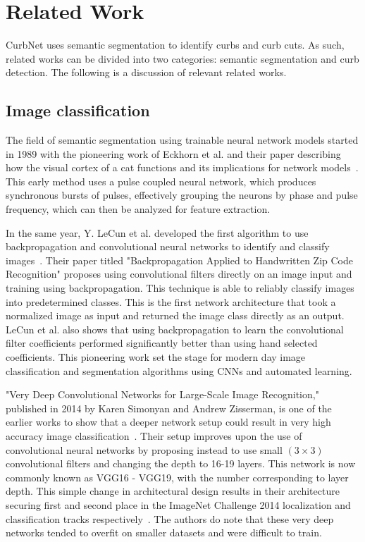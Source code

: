 \chapter{Related Work}\label{chap:relatedwork}
CurbNet uses semantic segmentation to identify curbs and curb cuts.
As such, related works can be divided into two categories: semantic segmentation and curb detection.
The following is a discussion of relevant related works.

\section{Image classification}\label{section:relatedwork-classification}
The field of semantic segmentation using trainable neural network models started in 1989 with the pioneering work of Eckhorn et al. and their paper describing how the visual cortex of a cat functions and its implications for network models~\cite{eckhorncat}.
This early method uses a pulse coupled neural network, which produces synchronous bursts of pulses, effectively grouping the neurons by phase and pulse frequency, which can then be analyzed for feature extraction.

In the same year, Y. LeCun et al. developed the first algorithm to use backpropagation and convolutional neural networks to identify and classify images~\cite{zipcode}.
Their paper titled "Backpropagation Applied to Handwritten Zip Code Recognition" proposes using convolutional filters directly on an image input and training using backpropagation.
This technique is able to reliably classify images into predetermined classes.
This is the first network architecture that took a normalized image as input and returned the image class directly as an output.
LeCun et al. also shows that using backpropagation to learn the convolutional filter coefficients performed significantly better than using hand selected coefficients.
This pioneering work set the stage for modern day image classification and segmentation algorithms using CNNs and automated learning.

"Very Deep Convolutional Networks for Large-Scale Image Recognition," published in 2014 by Karen Simonyan and Andrew Zisserman, is one of the earlier works to show that a deeper network setup could result in very high accuracy image classification~\cite{vgg}.
Their setup improves upon the use of convolutional neural networks by proposing instead to use small $\left(3 \times 3\right)$ convolutional filters and changing the depth to 16-19 layers.
This network is now commonly known as VGG16 - VGG19, with the number corresponding to layer depth.
This simple change in architectural design results in their architecture securing first and second place in the ImageNet Challenge 2014 localization and classification tracks respectively~\cite{vgg}.
The authors do note that these very deep networks tended to overfit on smaller datasets and were difficult to train.

